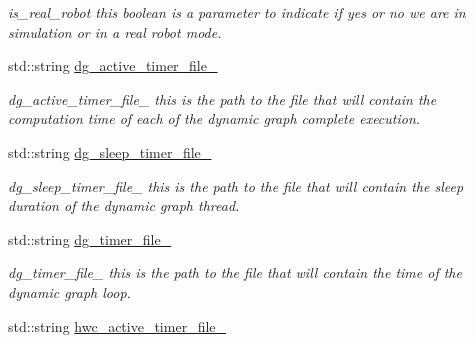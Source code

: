 \begin{DoxyCompactItemize}
\begin{DoxyCompactList}\small\item\em is\+\_\+real\+\_\+robot this boolean is a parameter to indicate if yes or no we are in simulation or in a real robot mode. \end{DoxyCompactList}\item 
std\+::string \hyperlink{classdynamic__graph_1_1DynamicGraphManager_a18c2cc959dceef659ab1f567e06254f7}{dg\+\_\+active\+\_\+timer\+\_\+file\+\_\+}\hypertarget{classdynamic__graph_1_1DynamicGraphManager_a18c2cc959dceef659ab1f567e06254f7}{}\label{classdynamic__graph_1_1DynamicGraphManager_a18c2cc959dceef659ab1f567e06254f7}

\begin{DoxyCompactList}\small\item\em dg\+\_\+active\+\_\+timer\+\_\+file\+\_\+ this is the path to the file that will contain the computation time of each of the dynamic graph complete execution. \end{DoxyCompactList}\item 
std\+::string \hyperlink{classdynamic__graph_1_1DynamicGraphManager_af02dbc7fb67674937208abe4cd75d652}{dg\+\_\+sleep\+\_\+timer\+\_\+file\+\_\+}\hypertarget{classdynamic__graph_1_1DynamicGraphManager_af02dbc7fb67674937208abe4cd75d652}{}\label{classdynamic__graph_1_1DynamicGraphManager_af02dbc7fb67674937208abe4cd75d652}

\begin{DoxyCompactList}\small\item\em dg\+\_\+sleep\+\_\+timer\+\_\+file\+\_\+ this is the path to the file that will contain the sleep duration of the dynamic graph thread. \end{DoxyCompactList}\item 
std\+::string \hyperlink{classdynamic__graph_1_1DynamicGraphManager_a1a43bcf9c74648466d1e561203a39d87}{dg\+\_\+timer\+\_\+file\+\_\+}\hypertarget{classdynamic__graph_1_1DynamicGraphManager_a1a43bcf9c74648466d1e561203a39d87}{}\label{classdynamic__graph_1_1DynamicGraphManager_a1a43bcf9c74648466d1e561203a39d87}

\begin{DoxyCompactList}\small\item\em dg\+\_\+timer\+\_\+file\+\_\+ this is the path to the file that will contain the time of the dynamic graph loop. \end{DoxyCompactList}\item 
std\+::string \hyperlink{classdynamic__graph_1_1DynamicGraphManager_a2bd29dbd358b8c02805f4df970e75936}{hwc\+\_\+active\+\_\+timer\+\_\+file\+\_\+}\hypertarget{classdynamic__graph_1_1DynamicGraphManager_a2bd29dbd358b8c02805f4df970e75936}{}\label{classdynamic__graph_1_1DynamicGraphManager_a2bd29dbd358b8c02805f4df970e75936}


\end{DoxyCompactItemize}

